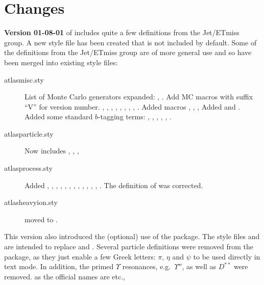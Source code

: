 \onecolumn
\section{Changes}
\label{sec:change}

\textbf{Version 01-08-01} of  includes quite a few definitions from the Jet/ETmiss group.
A new style file has been created  that is not included by default.
Some of the definitions from the Jet/ETmiss group are of more general use and so have been merged into existing style files:
\begin{description}
\item[atlasmisc.sty] List of Monte Carlo generators expanded:
  , .
  Add MC macros with suffix \enquote{V} for version number.
  , , , , , , ,
  , .
  Added macros , , ,
  Added  and .
  Added some standard $b$-tagging terms:
  , , , , , .
\item[atlasparticle.sty] Now includes , , ,
\item[atlasprocess.sty] Added , ,
  , , , ,
  , ,
  , , ,
  , .
  The definition of  was corrected.
\item[atlasheavyion.sty]  moved to .
\end{description}

This version also introduced the (optional) use of the  package.
The style files  and 
are intended to replace  and .
Several particle definitions were removed from the  package,
as they just enable a few Greek letters: $\pi$, $\eta$ and $\psi$ to be used directly in text mode.
In addition, the primed $\Upsilon$ resonances, e.g.\ $\Upsilon''$,
as well as $D^{**}$ were removed.
as the official names are  etc.,

